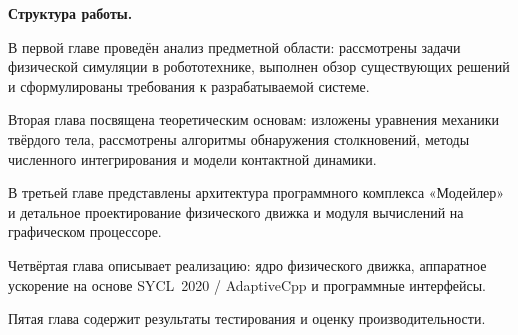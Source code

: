 \textbf{Структура работы.}

В первой главе проведён анализ предметной области: рассмотрены задачи физической симуляции в робототехнике, 
выполнен обзор существующих решений и сформулированы требования к разрабатываемой системе.

Вторая глава посвящена теоретическим основам: изложены уравнения механики твёрдого тела, рассмотрены алгоритмы 
обнаружения столкновений, методы численного интегрирования и модели контактной динамики.

В третьей главе представлены архитектура программного комплекса «Модейлер» и детальное проектирование 
физического движка и модуля вычислений на графическом процессоре.

Четвёртая глава описывает реализацию: ядро физического движка, аппаратное ускорение на основе SYCL~2020 / 
AdaptiveCpp и программные интерфейсы.

Пятая глава содержит результаты тестирования и оценку производительности.
